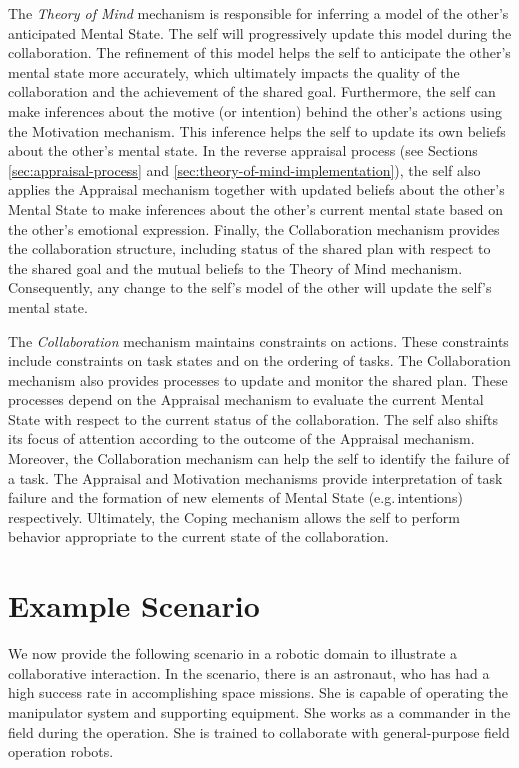 \documentclass[12pt]{report}
\begin{document}
The \textit{Theory of Mind} mechanism is responsible for inferring a model of
the other's anticipated Mental State. The self will progressively update this
model during the collaboration. The refinement of this model helps the self to
anticipate the other's mental state more accurately, which ultimately impacts
the quality of the collaboration and the achievement of the shared goal.
Furthermore, the self can make inferences about the motive (or intention) behind
the other's actions using the Motivation mechanism. This inference helps the
self to update its own beliefs about the other's mental state. In the reverse
appraisal process (see Sections \ref{sec:appraisal-process} and
\ref{sec:theory-of-mind-implementation}), the self also applies the Appraisal
mechanism together with updated beliefs about the other's Mental State to make
inferences about the other's current mental state based on the other's emotional
expression. Finally, the Collaboration mechanism provides the collaboration
structure, including status of the shared plan with respect to the shared goal
and the mutual beliefs to the Theory of Mind mechanism. Consequently, any change
to the self's model of the other will update the self's mental state.

The \textit{Collaboration} mechanism maintains constraints on actions. These
constraints include constraints on task states and on the ordering of tasks. The
Collaboration mechanism also provides processes to update and monitor the shared
plan. These processes depend on the Appraisal mechanism to evaluate the current
Mental State with respect to the current status of the collaboration. The self
also shifts its focus of attention according to the outcome of the Appraisal
mechanism. Moreover, the Collaboration mechanism can help the self to identify the
failure of a task. The Appraisal and Motivation mechanisms provide interpretation
of task failure and the formation of new elements of Mental State
(e.g.\,intentions) respectively. Ultimately, the Coping mechanism allows the
self to perform behavior appropriate to the current state of the collaboration.

\section{Example Scenario}
\label{sec:example-scenario}
We now provide the following scenario in a robotic domain to illustrate a
collaborative interaction. In the scenario, there is an astronaut, who has had a
high success rate in accomplishing space missions. She is capable of operating
the manipulator system and supporting equipment. She works as a commander in the
field during the operation. She is trained to collaborate with general-purpose
field operation robots.
\end{document}
